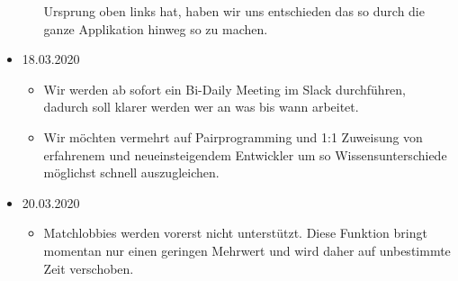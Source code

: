 \documentclass[a4paper, 11pt]{scrartcl}
\begin{document}
\begin{itemize}
\begin{itemize}
                Ursprung oben links hat, haben wir uns entschieden das so durch die ganze Applikation hinweg so zu machen.
        \end{itemize}
  \item 18.03.2020
        \begin{itemize}
          \item Wir werden ab sofort ein Bi-Daily Meeting im Slack durchführen, dadurch soll klarer werden wer an was bis wann arbeitet.
          \item Wir möchten vermehrt auf Pairprogramming und 1:1 Zuweisung von erfahrenem und neueinsteigendem Entwickler um so
                Wissensunterschiede möglichst schnell auszugleichen.
        \end{itemize}
  \item 20.03.2020
        \begin{itemize}
          \item Matchlobbies werden vorerst nicht unterstützt. Diese Funktion bringt momentan nur einen geringen Mehrwert und wird daher auf unbestimmte
                Zeit verschoben.
        \end{itemize}
\end{itemize}

\clearpage

\printglossary[type=\acronymtype]

\printglossary
\end{document}
